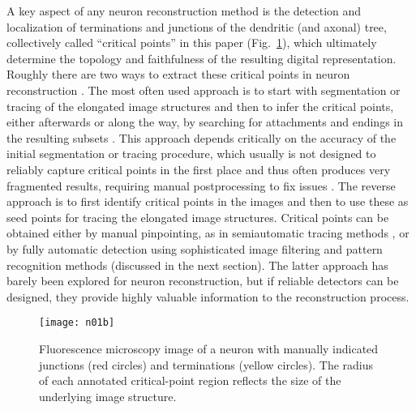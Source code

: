 \documentclass[twocolumn,natbib]{svjour3}
\newcommand{\marked}[1]{\textcolor{red}{#1}}
\begin{document}
A key aspect of any neuron reconstruction method is the detection and localization of terminations and junctions of the dendritic (and axonal) tree, collectively called ``critical points'' in this paper (Fig.~\ref{fig:example}), which ultimately determine the topology and faithfulness of the resulting digital representation. Roughly there are two ways to extract these critical points in neuron reconstruction \citep{al2008improved, meijering2010neuron,Basu-2013}. The most often used approach is to start with segmentation or tracing of the elongated image structures and then to infer the critical points, either afterwards or along the way, by searching for attachments and endings in the resulting subsets \citep{Dima-2002, xiong2006automated, narro2007neuronmetrics, vasilkoski2009detection, bas2011principal, chothani2011automated, Dehmelt-2011, ho2011neurphologyj, choromanska2012automatic, xiao2013app2}. This approach depends critically on the accuracy of the initial segmentation or tracing procedure, which usually is not designed to reliably capture critical points in the first place and thus often produces very fragmented results, requiring manual postprocessing to fix issues \citep{Peng-2011,Luisi-2011,Dercksen-2014}. The reverse approach is to first identify critical points in the images and then to use these as seed points for tracing the elongated image structures. Critical points can be obtained either by manual pinpointing, as in semiautomatic tracing methods \marked{\citep{meijering2004design, Schmitt-2004, narro2007neuronmetrics, lu2009semi, peng2010v3d, longair2011simple}}, or by fully automatic detection using sophisticated image filtering and pattern recognition methods (discussed in the next section). The latter approach has barely been explored for neuron reconstruction, but if reliable detectors can be designed, they provide highly valuable information to the reconstruction process.

\begin{figure}[!t]
\centering
\texttt{[image: n01b]} %
\caption{Fluorescence microscopy image of a neuron with manually indicated junctions (red circles) and terminations (yellow circles). The radius of each annotated critical-point region reflects the size of the underlying image structure.}
\label{fig:example}
\end{figure}
\end{document}
